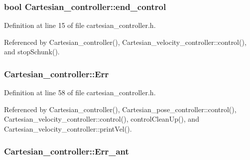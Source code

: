 \hypertarget{classCartesian__controller_a3c0a72214891f68e2bad63bf2b688f9c}{
\subsubsection[{end\-\_\-control}]{\setlength{\rightskip}{0pt plus 5cm}bool Cartesian\-\_\-controller\-::end\-\_\-control\hspace{0.3cm}{\ttfamily [protected]}}}\label{classCartesian__controller_a3c0a72214891f68e2bad63bf2b688f9c}


Definition at line 15 of file cartesian\-\_\-controller.\-h.



Referenced by Cartesian\-\_\-controller(), Cartesian\-\_\-velocity\-\_\-controller\-::control(), and stop\-Schunk().

\hypertarget{classCartesian__controller_ab3f08ecf10cb2486e8bfc61f07e2bde6}{
\subsubsection[{Err}]{ Cartesian\-\_\-controller\-::\-Err\hspace{0.3cm}{\ttfamily [protected]}}}\label{classCartesian__controller_ab3f08ecf10cb2486e8bfc61f07e2bde6}


Definition at line 58 of file cartesian\-\_\-controller.\-h.



Referenced by Cartesian\-\_\-controller(), Cartesian\-\_\-pose\-\_\-controller\-::control(), Cartesian\-\_\-velocity\-\_\-controller\-::control(), control\-Clean\-Up(), and Cartesian\-\_\-velocity\-\_\-controller\-::print\-Vel().

\hypertarget{classCartesian__controller_a6d9471a983f6cb6c642bf8dea0d540af}{
\subsubsection[{Err\-\_\-ant}]{ Cartesian\-\_\-controller\-::\-Err\-\_\-ant\hspace{0.3cm}{\ttfamily [protected]}}}\label{classCartesian__controller_a6d9471a983f6cb6c642bf8dea0d540af}


